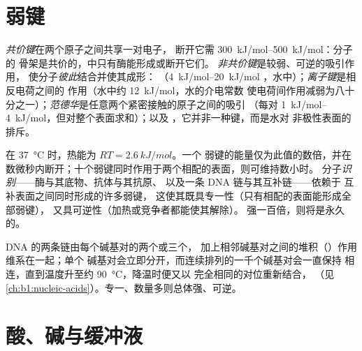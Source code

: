 \section{弱键}

\begin{definition}[共价键与非共价键]\label{def:b1:water-small-molecules:bonds}
\emph{共价键}在两个原子之间共享一对电子，
断开它需 \qtyrange{300}{500}{kJ/mol}：分子的
骨架是共价的，中只有酶能形成或断开它们。
\emph{非共价键}是较弱、可逆的吸引作用，
使分子\emph{彼此}结合并使其成形：
\emph{}（\qtyrange{4}{20}{kJ/mol}
，水中）；\emph{离子键}是相反电荷之间的
作用（水中约 \qty{12}{kJ/mol}，水的介电常数
使电荷间作用减弱为八十分之一）；\emph{范德华}是任意两个紧密接触的原子之间的吸引
（每对 \qtyrange{1}{4}{kJ/mol}，但对整个表面求和）；以及
\emph{}，它并非一种键，而是水对
非极性表面的排斥。
\end{definition}

\begin{proposition}[为何弱键是生命的键]\label{prop:b1:water-small-molecules:weak}
在 \qty{37}{\celsius} 时，热能为 $RT = \qty{2.6}{kJ/mol}$。一个
弱键的能量仅为此值的数倍，并在
数微秒内断开；十个弱键同时作用于两个相配的表面，则可维持数小时。
分子\emph{识别}——酶与其底物、抗体与其抗原、
以及一条 DNA 链与其互补链——依赖于
互补表面之间同时形成的许多弱键，
这使其既具专一性（只有相配的表面能形成全部弱键），
又具可逆性（加热或竞争者都能使其解除）。
强一百倍，则将是永久的。
\end{proposition}

\begin{example}[双螺旋的熔化]\label{ex:b1:water-small-molecules:melting}
DNA 的两条链由每个碱基对的两个或三个，
加上相邻碱基对之间的堆积（）作用维系在一起；单个
碱基对会立即分开，而连续排列的一千个碱基对会一直保持
相连，直到温度升至约 \qty{90}{\celsius}，降温时便又以
完全相同的对位重新结合，
（见\cref{ch:b1:nucleic-acids}）。专一、数量多则总体强、可逆。
\end{example}

\section{酸、碱与缓冲液}

